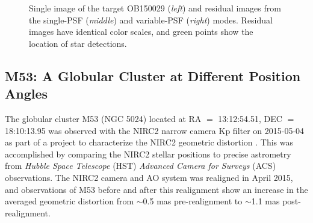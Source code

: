 \documentclass[]{spie}  %
\begin{document}
\begin{figure}[!h]
 \caption{\footnotesize Single image of the target OB150029 (\textit{left}) and residual images from the single-PSF (\textit{middle}) and variable-PSF (\textit{right}) modes. Residual images have identical color scales, and green points show the location of star detections.} \label{fig:ob150029-targ-res}
\end{figure}


\subsection{M53: A Globular Cluster at Different Position Angles} \label{sec:m53-data}
The globular cluster M53 (NGC 5024) located at RA $=$ 13:12:54.51, DEC $=$ 18:10:13.95 was observed with the NIRC2 narrow camera Kp filter on 2015-05-04 as part of a project to characterize the NIRC2 geometric distortion \cite{service:2016a}. This was accomplished by comparing the NIRC2 stellar positions to precise astrometry from \textit{Hubble Space Telescope} (HST) \textit{Advanced Camera for Surveys} (ACS) observations. The NIRC2 camera and AO system was realigned in April 2015, and observations of M53 before and after this realignment show an increase in the averaged geometric distortion from $\sim$0.5 mas pre-realignment to $\sim$1.1 mas post-realignment.
\end{document}
